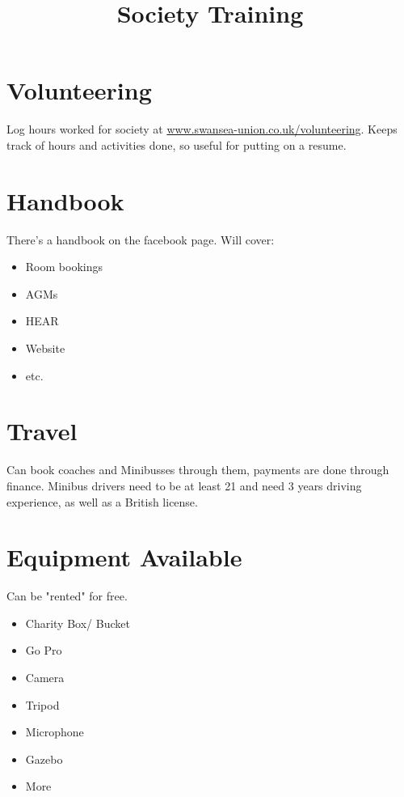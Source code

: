 \documentclass[12pt,a4paper]{article}
\begin{document}
\title{Society Training}
\maketitle

\newpage

\tableofcontents

\newpage

\section{Volunteering}
	Log hours worked for society at \url{www.swansea-union.co.uk/volunteering}. Keeps track of hours and activities done, so useful for putting on a resume.
	
\section{Handbook}
	There's a handbook on the facebook page. Will cover:
	\begin{itemize}
		\item Room bookings
		\item AGMs
		\item HEAR
		\item Website 
		\item etc. 
	\end{itemize}
	
\section{Travel}
	Can book coaches and Minibusses through them, payments are done through finance. Minibus drivers need to be at least 21 and need 3 years driving experience, as well as a British license. 
	
\section{Equipment Available}
	Can be "rented" for free.
	\begin{itemize}
		\item Charity Box/ Bucket
		\item Go Pro
		\item Camera
		\item Tripod
		\item Microphone
		\item Gazebo
		\item More
	\end{itemize}
	
\end{document}
